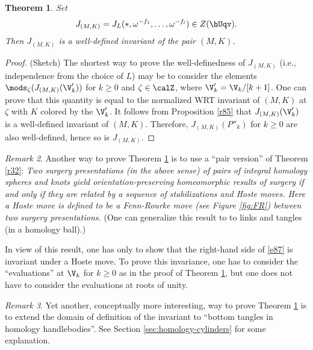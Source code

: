 \documentclass{amsart}
\numberwithin{equation}{section}
\numberwithin{figure}{section}
\theoremstyle{plain}
\newtheorem{theorem}{Theorem}[section]
\theoremstyle{definition}
\theoremstyle{remark}
\newtheorem{remark}[theorem]{Remark}
\begin{document}
\begin{theorem}
  \label{r79}
  Set
  \begin{equation}
    \label{e87}
    J_{(M,K)} = J_L(*,\omega ^{-f_1},\ldots,\omega ^{-f_l})\in Z(\hUqv).
  \end{equation}
  Then $J_{(M,K)}$ is a well-defined invariant of the pair $(M,K)$.
\end{theorem}

\begin{proof} (Sketch)
  The shortest way to prove the well-definedness of $J_{(M,K)}$ (i.e.,
  independence from the choice of $L$) may be to consider the elements
  $\mods _\zeta (J_{(M,K)}(\V'_k))$ for $k\ge 0$ and $\zeta \in \calZ$, where
  $\V'_k=\V_k/[k+1]$.  One can prove that this quantity is equal to
  the normalized WRT invariant of $(M,K)$ at
  $\zeta $ with $K$ colored by the $\V'_k$.  It follows from Proposition
  \ref{r85} that $J_{(M,K)}(\V'_k)$ is a well-defined invariant of
  $(M,K)$.  Therefore, $J_{(M,K)}(P''_k)$ for $k\ge 0$ are also
  well-defined, hence so is $J_{(M,K)}$.
\end{proof}

\begin{remark}
  \label{r78}
  Another way to prove Theorem \ref{r79} is to use a ``pair version''
  of Theorem \ref{r32}: {\it Two surgery presentations (in the above
  sense) of pairs of integral homology spheres and knots yield
  orientation-preserving homeomorphic results of surgery if and only
  if they are related by a sequence of stabilizations and Hoste moves.
  Here a Hoste move is defined to be a Fenn-Rourke move (see Figure
  \ref{fig:FR}) between two surgery presentations.}  (One can
  generalize this result to to links and tangles (in a homology ball).)

  In view of this result, one has only to show that the right-hand
  side of \eqref{e87} is invariant under a Hoste move.  To prove this
  invariance, one has to consider the ``evaluations'' at $\V_k$ for
  $k\ge 0$ as in the proof of Theorem \ref{r79}, but one does not have
  to consider the evaluations at roots of unity.
\end{remark}

\begin{remark}
  \label{r37}
  Yet another, conceptually more interesting, way to prove Theorem
  \ref{r79} is to extend the domain of definition of the invariant to
  ``bottom tangles in homology handlebodies''.  See Section
  \ref{sec:homology-cylinders} for some explanation.
\end{remark}
\end{document}
